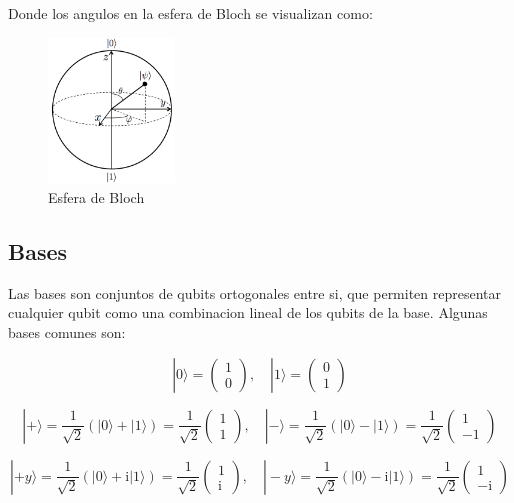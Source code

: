 \documentclass[11pt]{article}
\newcommand{\ii}{\mathrm{i}}
\begin{document}
Donde los angulos en la esfera de Bloch se visualizan como:

\begin{figure}[H]
    \centering
    \includegraphics[width=0.3\textwidth]{ANGULOS.png}
    \caption{Esfera de Bloch}
    \label{fig:bloch_sphere}
\end{figure}


\subsection{Bases}

Las bases son conjuntos de qubits ortogonales entre si, que permiten representar cualquier qubit como una combinacion lineal de los qubits de la base. Algunas bases comunes son:

\begin{equation}
    |0\rangle = \begin{pmatrix} 1 \\ 0 \end{pmatrix}, \quad |1\rangle = \begin{pmatrix} 0 \\ 1 \end{pmatrix}
\end{equation}

\begin{equation}
    |+\rangle = \frac{1}{\sqrt{2}} (|0\rangle + |1\rangle) = \frac{1}{\sqrt{2}} \begin{pmatrix} 1 \\ 1 \end{pmatrix}, \quad |-\rangle = \frac{1}{\sqrt{2}} (|0\rangle - |1\rangle) = \frac{1}{\sqrt{2}} \begin{pmatrix} 1 \\ -1 \end{pmatrix}
\end{equation}

\begin{equation}
    |+y\rangle = \frac{1}{\sqrt{2}} (|0\rangle + \ii |1\rangle) = \frac{1}{\sqrt{2}} \begin{pmatrix} 1 \\ \ii \end{pmatrix}, \quad |-y\rangle = \frac{1}{\sqrt{2}} (|0\rangle - \ii |1\rangle) = \frac{1}{\sqrt{2}} \begin{pmatrix} 1 \\ -\ii \end{pmatrix}
\end{equation}
\end{document}
